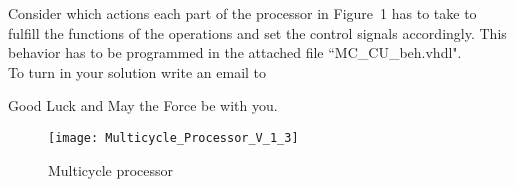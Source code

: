 \documentclass[a4paper,12pt]{article}
\begin{document}
Consider which actions each part of the processor in Figure~1 has to take to fulfill the functions of the operations and set the control signals accordingly. This behavior has to be programmed in the attached file ``MC\_CU\_beh.vhdl".\\


To turn in your solution write an email to %


\vspace{0.7cm}
Good Luck and May the Force be with you.

\begin{landscape}
\begin{figure}[!h]
\vspace{-1cm}
\hspace{-1.8cm}
\texttt{[image: Multicycle\_Processor\_V\_1\_3]}
\caption{Multicycle processor}
\label{fig:MulticycleProcessor}
\end{figure}
\end{landscape}
\end{document}
